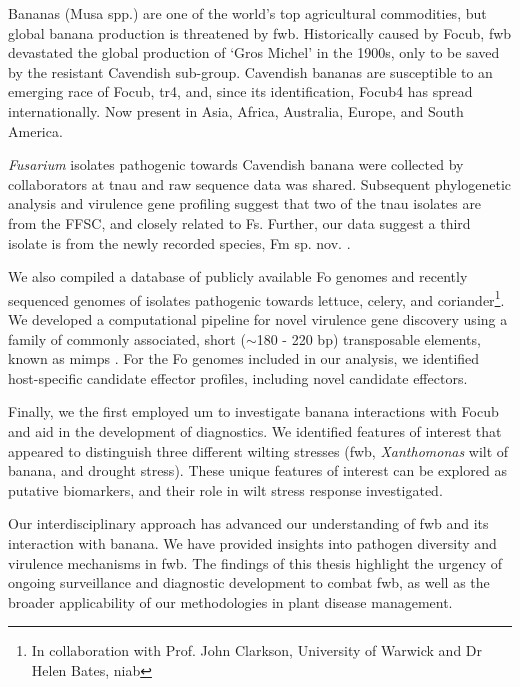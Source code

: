 Bananas (Musa spp.) are one of the world’s top agricultural commodities, but global banana production is threatened by \acf{fwb}. Historically caused by \acf{Focub}, \ac{fwb} devastated the global production of ‘Gros Michel’ in the 1900s, only to be saved by the resistant Cavendish sub-group. Cavendish bananas are susceptible to an emerging race of \ac{Focub}, \ac{tr4}, and, since its identification, \ac{Focub4} has spread internationally. Now present in Asia, Africa, Australia, Europe, and South America. 

\textit{Fusarium} isolates pathogenic towards Cavendish banana were collected by collaborators at \acf{tnau} and raw sequence data was shared. Subsequent phylogenetic analysis and virulence gene profiling suggest that two of the \ac{tnau} isolates are from the \acl{FFSC}, and closely related to \acl{Fs}. Further, our data suggest a third isolate is from the newly recorded species, \acl{Fm} sp. nov. \parencite{Nozawa2023}. 

We also compiled a database of publicly available \acf{Fo} genomes and recently sequenced genomes of isolates pathogenic towards lettuce, celery, and coriander\footnote{In collaboration with Prof. John Clarkson, University of Warwick and Dr Helen Bates, \acl{niab}}. We developed a computational pipeline for novel virulence gene discovery using a family of commonly associated, short ($\sim$180 - 220 bp) transposable elements, known as \aclp{mimp} \parencite{Schmidt2013}. For the \ac{Fo} genomes included in our analysis, we identified host-specific candidate effector profiles, including novel candidate effectors.

Finally, we the first employed \acl{um} to investigate banana interactions with \ac{Focub} and aid in the development of diagnostics. We identified features of interest that appeared to distinguish three different wilting stresses (\ac{fwb}, \textit{Xanthomonas} wilt of banana, and drought stress). These unique features of interest can be explored as putative biomarkers, and their role in wilt stress response investigated. 

Our interdisciplinary approach has advanced our understanding of \ac{fwb} and its interaction with banana. We have provided insights into pathogen diversity and virulence mechanisms in \ac{fwb}. The findings of this thesis highlight the urgency of ongoing surveillance and diagnostic development to combat \ac{fwb}, as well as the broader applicability of our methodologies in plant disease management. 
